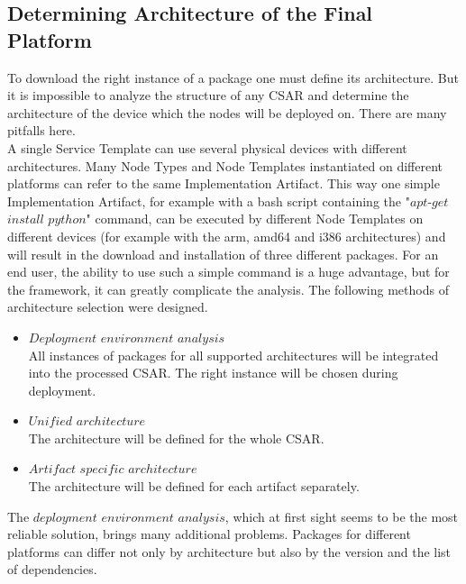 \subsection{Determining Architecture of the Final Platform} \label{finplatf}
To download the right instance of a package one must define its architecture.
But it is impossible to analyze the structure of any CSAR and determine the architecture of the device which the nodes will be deployed on.
There are many pitfalls here.\\
A single Service Template can use several physical devices with different architectures.
Many Node Types and Node Templates instantiated on different platforms can refer to the same Implementation Artifact.
This way one simple Implementation Artifact, for example with a bash script containing the "$apt$-$get$ $install$ $python$" command, can be executed by different Node Templates on different devices (for example with the arm, amd64 and i386 architectures) and will result in the download and installation of three different packages. 
For an end user, the ability to use such a simple command is a huge advantage, but for the framework, it can greatly complicate the analysis.
The following methods of architecture selection were designed.
\begin{itemize}
	\item $Deployment$ $environment$ $analysis$\\
	All  instances of packages for all supported architectures will be integrated into the processed CSAR. 
	The right instance will be chosen during deployment.
	\item $Unified$ $architecture$\\
	The architecture will be defined for the whole CSAR.
	\item $Artifact$ $specific$ $architecture$\\
	The architecture will be defined for each artifact separately.
\end{itemize}
The $deployment$ $environment$ $analysis$, which at first sight seems to be the most reliable solution, brings many additional problems.
Packages for different platforms can differ not only by architecture but also by the version and the list of dependencies.
